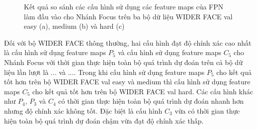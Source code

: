 {    \begin{figure}[H]
        \centering
        \caption{Kết quả so sánh các cấu hình sử dụng các feature maps  của FPN làm đầu vào cho Nhánh Focus  trên ba bộ dữ liệu WIDER FACE val easy (a), medium (b) và hard (c)}
        \label{fig:retinafocus_widerface_val_fpn}
    \end{figure}

    \noindent
    Đối với bộ WIDER FACE thông thường, hai cấu hình đạt độ chính xác cao nhất là cấu hình sử dụng feature maps  ${P}_{5}$ và cấu hình sử dụng feature maps  ${C}_{5}$ cho Nhánh Focus  với thời gian thực hiện toàn bộ quá trình dự đoán trên cả bộ dữ liệu lần lượt là ... và ....
    Trong khi cấu hình sử dụng feature maps  ${P}_{5}$ cho kết quả tốt hơn trên bộ WIDER FACE val easy và medium thì cấu hình sử dụng feature maps  ${C}_{5}$ cho kết quả tốt hơn trên bộ WIDER FACE val hard.
    Các cấu hình khác như ${P}_{4}$, ${P}_{3}$ và ${C}_{4}$ có thời gian thực hiện toàn bộ quá trình dự đoán nhanh hơn nhưng độ chính xác không tốt.
    Đặc biệt là cấu hình ${C}_{3}$ vừa có thời gian thực hiện toàn bộ quá trình dự đoán chậm vừa đạt độ chính xác thấp.

}
